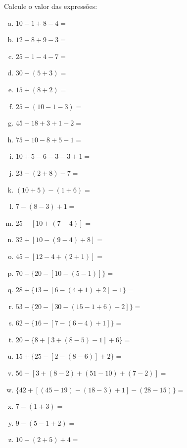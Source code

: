 	\item Calcule o valor das expressões:
	\begin{multicols}{2}
	\begin{enumerate}[a)]
		\item $10 - 1 + 8 - 4 = $				
		\item $12 - 8 + 9 - 3 = $	
		\item $25 - 1 - 4 - 7 =$	
		\item $30 - ( 5 + 3 ) =$	
		\item $15 + ( 8 + 2 ) =$	
		\item $25 - ( 10 - 1 - 3 ) =$	
		\item $45 - 18 + 3 + 1 - 2 =$	
		\item $75 - 10 - 8 + 5 - 1 =$				
		\item $10 + 5 - 6 - 3 - 3 + 1 =$	
		\item $23 - ( 2 + 8 ) - 7 =$	
		\item $( 10 + 5 ) - ( 1 + 6 ) =$	
		\item $7 - ( 8 - 3 ) + 1 =$	
		\item $25 - [ 10 + ( 7 - 4 ) ] = $				
		\item $32+ [ 10 - ( 9 - 4 ) + 8 ] =$	
		\item $45 - [ 12 - 4 + ( 2 + 1 )] =$	
		\item $70 - \{ 20 - [ 10 - ( 5 - 1 ) ]\} =$	
		\item $28 + \{ 13 - [ 6 - ( 4 + 1 ) + 2 ] - 1 \}=$	
		\item $53 - \{ 20 - [ 30 - ( 15 - 1 + 6 ) + 2 ]\} =$	
		\item $ 62 - \{ 16 - [ 7 - ( 6 - 4 ) + 1 ]\} =$
		\item $20 - \{ 8 + [ 3 + ( 8 - 5 ) - 1 ] + 6\} =$				
		\item $15 + \{ 25 - [ 2 - ( 8 - 6 )] + 2 \} = $	
		\item $56 - [ 3 + ( 8 - 2 ) + ( 51 - 10 ) + ( 7 - 2 )] =$	
		\item $\{ 42 + [ (45 - 19) - ( 18 - 3 ) + 1] - (28 - 15 )\}  =$	
		\item $ 7 - ( 1 + 3 ) =$	
		\item  $9 - ( 5 - 1 + 2 ) =$
		\item $10 - ( 2 + 5 ) + 4 =$	
	\end{enumerate}
	\end{multicols}
	
